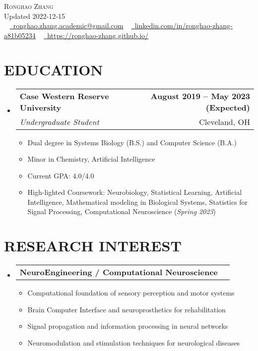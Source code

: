 \documentclass[letterpaper,11pt]{article}
\makeatletter
\newcommand{\resumeItem}[1]{
	\item\small{
		{#1 \vspace{0pt}}
	}
}
\newcommand{\resumeSubheading}[4]{
	\vspace{-2pt}\item
	\begin{tabular*}{1.0\textwidth}[t]{l@{\extracolsep{\fill}}r}
		\textbf{#1} & \textbf{\small #2} \\
		\textit{\small#3} & {\small #4} \\
	\end{tabular*}\vspace{-4pt}
}
\newcommand{\resumeResearchHeading}[2]{
	\vspace{-2pt}\item
	\begin{tabular*}{1.0\textwidth}[t]{l@{\extracolsep{\fill}}r}
		\textbf{#1} & \textbf{\small #2} \\
	\end{tabular*}\vspace{-4pt}
}
\newcommand{\resumeSubHeadingListStart}{\begin{itemize}[leftmargin=0.0in, label={}]}
\newcommand{\resumeSubHeadingListEnd}{\end{itemize}}
\newcommand{\resumeItemListStart}{\begin{itemize}}
\newcommand{\resumeItemListEnd}{\end{itemize}\vspace{-5pt}}
\makeatother
\begin{document}
	
	\begin{center}
		{\Huge \scshape Ronghao Zhang} 
		\\ \vspace{5pt}
		Updated 2022-12-15
		\\ \vspace{5pt}
		\small \raisebox{-0.1\height} ~ 
		\href{mailto:x@gmail.com}{\raisebox{-0.2\height}\faEnvelope\          \underline{ronghao.zhang.academic@gmail.com}} ~ 
		\href{https://linkedin.com/in//}{\raisebox{-0.2\height}\faLinkedin\     \underline{linkedin.com/in/ronghao-zhang-a81b05234}}  ~
		\href{https://ronghao-zhang.github.io/}{\raisebox{-0.2\height}\faGithub\ \underline{https://ronghao-zhang.github.io/}}
		\vspace{1pt}
	\end{center}
	
	\section{EDUCATION}
	\resumeSubHeadingListStart
	\resumeSubheading
	{Case Western Reserve University}{August 2019 -- May 2023 (Expected)}
	{Undergraduate Student}{Cleveland, OH}
	\resumeItemListStart
	\resumeItem{Dual degree in Systems Biology (B.S.) and Computer Science (B.A.)}
	\resumeItem{Minor in Chemistry, Artificial Intelligence}
	\resumeItem{Current GPA: 4.0/4.0}
	\resumeItem{High-lighted Coursework: Neurobiology, Statistical Learning, Artificial Intelligence, Mathematical modeling in Biological Systems, Statistics for Signal Processing, Computational Neuroscience (\textit{Spring 2023})}
	\resumeItemListEnd
	\resumeSubHeadingListEnd
	
	\section{RESEARCH INTEREST}
	\resumeSubHeadingListStart
	\resumeResearchHeading{NeuroEngineering / Computational Neuroscience}{}
	\resumeItemListStart
	\resumeItem{Computational foundation of sensory perception and motor systems}
	\resumeItem{Brain Computer Interface and neuroprosthetics for rehabilitation}
	\resumeItem{Signal propagation and information processing in neural networks}
	\resumeItem{Neuromodulation and stimulation techniques for neurological diseases}
	\resumeItemListEnd
	\resumeSubHeadingListEnd      
	
\end{document}
